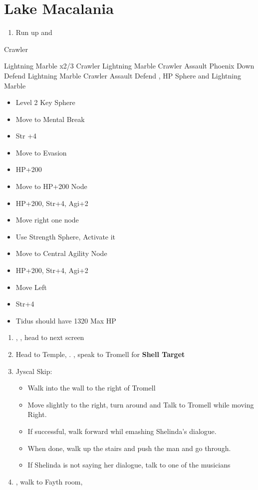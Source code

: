 \chapter{Lake Macalania}

\begin{enumerate}
	\item Run up and \sd
\end{enumerate}
\begin{battle}[1600]{Crawler}
\begin{itemize}
	\switch{\tidus}{\rikku}
	\rikkuf Lightning Marble x2/3 Crawler
	\kimahrif Lightning Marble Crawler
	\enemyf Assault \rikku
	\luluf Phoenix Down \rikku
	\switch{\kimahri}{\yuna}
	\yunaf Defend
	\rikkuf Lightning Marble Crawler
	\enemyf Assault \rikku
	\switch{\yuna}{\tidus}
	\tidusf Defend
	\rikkuf \od, HP Sphere and Lightning Marble
\end{itemize}
\end{battle}
\begin{spheregrid}
\begin{itemize}
	\tidusf
	\begin{itemize}
		\item Level 2 Key Sphere
		\item Move to Mental Break
		\item Str +4
		\item Move to Evasion
		\item HP+200
		\item Move to HP+200 Node
		\item HP+200, Str+4, Agi+2
		\item Move right one node
		\item Use Strength Sphere, Activate it
		\item Move to Central Agility Node
		\item HP+200, Str+4, Agi+2
		\item Move Left
		\item Str+4
		\item Tidus should have 1320 Max HP
	\end{itemize}
\end{itemize}
\end{spheregrid}
\begin{enumerate}[resume]
	\item \sd, \cs[0:40], head to next screen
	\item Head to Temple, \sd. \save, speak to Tromell for \textbf{Shell Target}
	\item Jyscal Skip:
	\begin{itemize}
		\item Walk into the wall to the right of Tromell
		\item Move slightly to the right, turn around and Talk to Tromell while moving Right.
		\item If successful, walk forward whil emashing Shelinda's dialogue.
		\item When done, walk up the stairs and push the man and go through.
		\item If Shelinda is not saying her dialogue, talk to one of the musicians
	\end{itemize}
	\item \sd, walk to Fayth room, \cs[2:10]
\end{enumerate}
